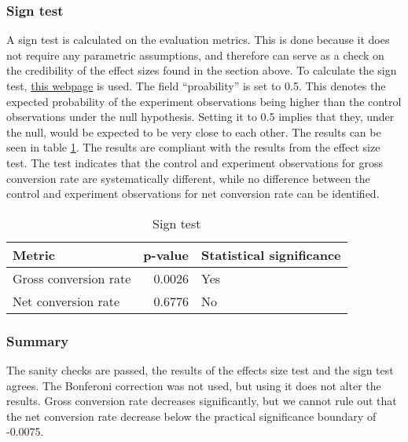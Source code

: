 \documentclass[12pt]{article}
\begin{document}
\subsubsection{Sign test}
A sign test is calculated on the evaluation metrics. This is done because it does not require any parametric assumptions, and therefore can serve as a check on the credibility of the effect sizes found in the section above.
To calculate the sign test, \href{http://graphpad.com/quickcalcs/binomial1/}{this webpage} is used. The field ``proability'' is set to 0.5. This denotes the expected probability of the experiment observations being higher than the control observations under the null hypothesis. Setting it to 0.5 implies that they, under the null, would be expected to be very close to each other.
The results can be seen in table \ref{tbl:sign}. The results are compliant with the results from the effect size test. The test indicates that the control and experiment observations for gross conversion rate are systematically different, while no difference between the control and experiment observations for net conversion rate can be identified.

\begin{table}[h]
\centering
\caption{Sign test}
\label{tbl:sign}
\begin{tabular}{@{}lrl@{}}
\toprule
\textbf{Metric} & \textbf{p-value} & \textbf{Statistical significance} \\
\midrule
Gross conversion rate 	&	0.0026 & Yes \\
Net conversion rate & 0.6776 & No \\
\bottomrule
\end{tabular}
\end{table}

\subsubsection{Summary}
The sanity checks are passed, the results of the effects size test and the sign test agrees. The Bonferoni correction was not used, but using it does not alter the results. Gross conversion rate decreases significantly, but we cannot rule out that the net conversion rate decrease below the practical significance boundary of -0.0075.
\end{document}
